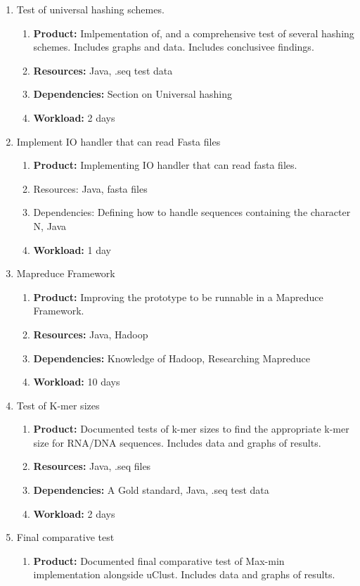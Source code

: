 \documentclass[../../main.tex]{subfiles}
\begin{document}
\begin{enumerate}
\item Test of universal hashing schemes.
\begin{enumerate}
\item {\bf Product:} Imlpementation of, and a comprehensive test of several hashing schemes. Includes graphs and data. Includes conclusivee findings.
\item {\bf Resources:} Java, .seq test data
\item {\bf Dependencies:} Section on Universal hashing
\item {\bf Workload:} 2 days
\end{enumerate}
\item Implement IO handler that can read Fasta files
\begin{enumerate}
\item {\bf Product:} Implementing IO handler that can read fasta files.
\item {Resources:} Java, fasta files
\item {Dependencies:} Defining how to handle sequences containing the character N, Java
\item {\bf Workload:} 1 day
\end{enumerate}
\item Mapreduce Framework
\begin{enumerate}
\item {\bf Product:} Improving the prototype to be runnable in a Mapreduce Framework.
\item {\bf Resources:} Java, Hadoop
\item {\bf Dependencies:} Knowledge of Hadoop, Researching Mapreduce
\item {\bf Workload:} 10 days
\end{enumerate}
\item Test of  K-mer sizes
\begin{enumerate}
\item {\bf Product:} Documented tests of k-mer sizes to find the appropriate k-mer size for RNA/DNA sequences. Includes data and graphs of results.
\item {\bf Resources:} Java, .seq files
\item {\bf Dependencies:} A Gold standard, Java, .seq test data
\item {\bf Workload:} 2 days
\end{enumerate}
\item Final comparative test
\begin{enumerate}
\item {\bf Product:} Documented final comparative test of Max-min implementation alongside uClust. Includes data and graphs of results.

\end{enumerate}
\end{enumerate}
\end{document}
